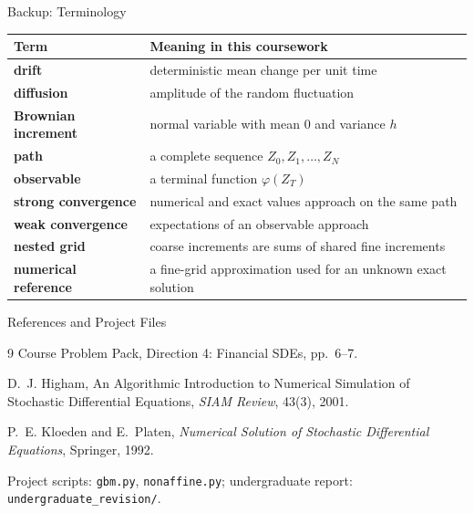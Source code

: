 \documentclass[aspectratio=169,10pt]{beamer}
\newcommand{\code}[1]{\texttt{#1}}
\begin{document}
\begin{frame}{Backup: Terminology}
  \begin{tabularx}{\textwidth}{>{\bfseries}p{3.0cm}X}
    \toprule
    Term & Meaning in this coursework \\
    \midrule
    drift & deterministic mean change per unit time \\
    diffusion & amplitude of the random fluctuation \\
    Brownian increment & normal variable with mean $0$ and variance $h$ \\
    path & a complete sequence $Z_0,Z_1,\ldots,Z_N$ \\
    observable & a terminal function $\varphi(Z_T)$ \\
    strong convergence & numerical and exact values approach on the same path \\
    weak convergence & expectations of an observable approach \\
    nested grid & coarse increments are sums of shared fine increments \\
    numerical reference & a fine-grid approximation used for an unknown exact solution \\
    \bottomrule
  \end{tabularx}
\end{frame}

\begin{frame}{References and Project Files}
  \begin{thebibliography}{9}
    Course Problem Pack, Direction 4: Financial SDEs, pp.~6--7.

    D.~J. Higham,
    \newblock An Algorithmic Introduction to Numerical Simulation of Stochastic Differential Equations,
    \newblock \emph{SIAM Review}, 43(3), 2001.

    P.~E. Kloeden and E.~Platen,
    \newblock \emph{Numerical Solution of Stochastic Differential Equations},
    \newblock Springer, 1992.
  \end{thebibliography}
  \vspace{0.3em}
  \small Project scripts: \code{gbm.py}, \code{nonaffine.py};
  undergraduate report: \code{undergraduate\_revision/}.
\end{frame}
\end{document}
